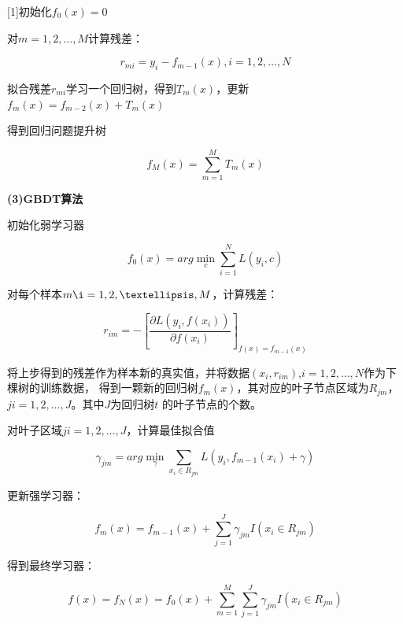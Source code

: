 \documentclass[UTF8]{ctexart}
\begin{document}
[1]初始化$f_0\left( x \right)=0 $	   \par
[2]对$m=1,2,…,M$计算残差： \par
\begin{equation}
r_{mi}=y_i-f_{m-1}\left( x \right) ,i=1,2,…,N
\end{equation}\par
拟合残差$r_{mi}$学习一个回归树，得到$T_m\left( x \right) $，更新$f_m\left( x \right) =f_{m-2}\left( x \right) +T_m\left( x \right) $ \par                    
[3]得到回归问题提升树 \par
\begin{equation}
	f_M\left( x \right) =\sum_{m=1}^M{T_m\left( x \right)}
\end{equation}\par
\textbf{(3)GBDT算法  }\par
[1]初始化弱学习器 \par
\begin{equation}
	f_0\left( x \right) =arg\underset{c}{\min}\sum_{i=1}^N{L\left( y_i,c \right)}
\end{equation}\par
[2]对每个样本$m\i=1,2,…,M$，计算残差： \par
\begin{equation}
r_{im}=-\left[ \frac{\partial L\left( y_i,f\left( x_i \right) \right)}{\partial f\left( x_i \right)} \right] _{f\left( x \right) =f_{m-1}\left( x \right)}
\end{equation}\par
将上步得到的残差作为样本新的真实值，并将数据$\left( x_i,r_{im} \right) $,$i=1,2,…,N$作为下棵树的训练数据， 得到一颗新的回归树$f_m\left( x \right) $，其对应的叶子节点区域为$R_{jm}$，$ji=1,2,…,J$。其中$J$为回归树$t$ 的叶子节点的个数。 \par
[3]对叶子区域$ji=1,2,…,J$，计算最佳拟合值 \par
\begin{equation}
\gamma _{jm}=arg\underset{\gamma}{\min}\sum_{x_i\in R_{jm}}{L\left( y_i,f_{m-1}\left( x_i \right) +\gamma \right)}
\end{equation}\par
[4]更新强学习器： \par
\begin{equation}
f_m\left( x \right) =f_{m-1}\left( x \right) +\sum_{j=1}^J{\gamma _{jm}I\left( x_i\in R_{jm} \right)}
\end{equation}\par
[5]得到最终学习器： \par
\begin{equation}
f\left( x \right) =f_N\left( x \right) =f_0\left( x \right) +\sum_{m=1}^M{\sum_{j=1}^J{\gamma _{jm}I\left( x_i\in R_{jm} \right)}}
\end{equation}\par
\end{document}

